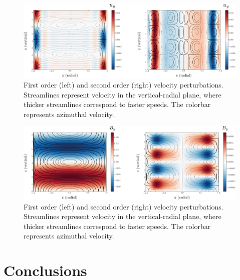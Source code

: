 \documentclass{emulateapj}
\begin{document}
\begin{figure}[h!]
\centering
\includegraphics[scale=0.5]{twoorders_velocity.eps}
\caption{First order (left) and second order (right) velocity perturbations. Streamlines represent velocity in the vertical-radial plane, where thicker streamlines correspond to faster speeds. The colorbar represents azimuthal velocity.}
\end{figure}

\begin{figure}[h!]
\centering
\includegraphics[scale=0.5]{twoorders_Bfield.eps}
\caption{First order (left) and second order (right) velocity perturbations. Streamlines represent velocity in the vertical-radial plane, where thicker streamlines correspond to faster speeds. The colorbar represents azimuthal velocity.}
\end{figure}

\section{Conclusions}
\end{document}

